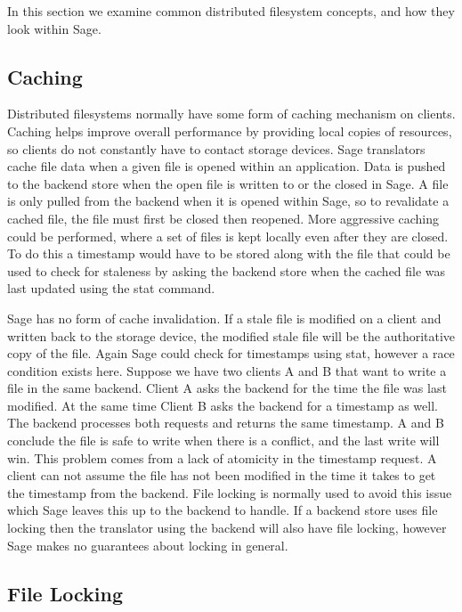 In this section we examine common distributed filesystem concepts, and how they look within Sage.

\subsection{Caching}

Distributed filesystems normally have some form of caching mechanism on clients. Caching helps improve overall performance by providing local copies of resources, so clients do not constantly have to contact storage devices. Sage translators cache file data when a given file is opened within an application. Data is pushed to the backend store when the open file is written to or the closed in Sage. A file is only pulled from the backend when it is opened within Sage, so to revalidate a cached file, the file must first be closed then reopened. More aggressive caching could be performed, where a set of files is kept locally even after they are closed. To do this a timestamp would have to be stored along with the file that could be used to check for staleness by asking the backend store when the cached file was last updated using the stat command.

Sage has no form of cache invalidation. If a stale file is modified on a client and written back to the storage device, the modified stale file will be the authoritative copy of the file. Again Sage could check for timestamps using stat, however a race condition exists here. Suppose we have two clients A and B that want to write a file in the same backend. Client A asks the backend for the time the file was last modified. At the same time Client B asks the backend for a timestamp as well. The backend processes both requests and returns the same timestamp. A and B conclude the file is safe to write when there is a conflict, and the last write will win. This problem comes from a lack of atomicity in the timestamp request. A client can not assume the file has not been modified in the time it takes to get the timestamp from the backend. File locking is normally used to avoid this issue which Sage leaves this up to the backend to handle. If a backend store uses file locking then the translator using the backend will also have file locking, however Sage makes no guarantees about locking in general.


\subsection{File Locking}

